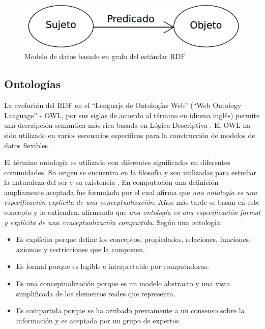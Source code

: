 \begin{figure}
	\centering
	  \includegraphics[width=12cm]{img/graficoRDF.png}
	\caption{Modelo de datos basado en grafo del estándar RDF}
	\label{fig:Modelo de datos basado en grafo del estándar RDF}
\end{figure}

\subsection{Ontologías}

La evolución del RDF en el ``Lenguaje de Ontologías Web'' (``Web Ontology Language'' - OWL, por sus siglas de acuerdo al término en idioma inglés) permite una descripción semántica más rica basada en Lógica Descriptiva \citep{Horrocks}. El OWL ha sido utilizado en varios escenarios específicos para la construcción de modelos de datos flexibles \citep{Agus,Munir,Franke2014,Sule2016}. 

El término ontología es utilizado con diferentes significados en diferentes comunidades. Su origen se encuentra en la filosofía y son utilizadas para estudiar la naturaleza del ser y su existencia \citep{Gruber1993,Gomez-Perez2004}. En computación una definición ampliamente aceptada fue formulada por \cite{Gruber1993} el cual afirma que \textit{una ontología es una especificación explícita de una conceptualización}. Años más tarde \cite{Studer1998} se basan en este concepto y lo extienden, afirmando que \textit{una ontología es una especificación formal y explícita de una conceptualización compartida}. Según \cite{Studer1998} una ontología:

\begin{itemize}
\item Es explícita porque define los conceptos, propiedades, relaciones, funciones, axiomas y restricciones que la componen.
\item Es formal porque es legible e interpretable por computadoras.
\item Es una conceptualización porque es un modelo abstracto y una vista simplificada de los elementos reales que representa.
\item Es compartida porque se ha arribado previamente a un consenso sobre la información y es aceptada por un grupo de expertos.
\end{itemize}


